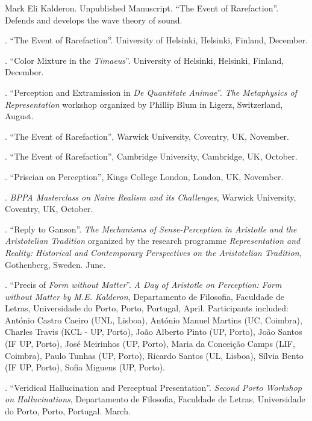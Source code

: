 \documentclass[11pt]{article}
\begin{document}
\ind Mark Eli Kalderon. Unpublished Manuscript. ``The Event of Rarefaction''. Defends and develops the wave theory of sound.

 \bigskip

\medskip
{}. ``The Event of Rarefaction''. University of Helsinki, Helsinki, Finland, December.

. ``Color Mixture in the \emph{Timaeus}''. University of Helsinki, Helsinki, Finland, December.

. ``Perception and Extramission in \emph{De Quantitate Animae}''. \emph{The Metaphysics of Representation} workshop organized by Phillip Blum in Ligerz, Switzerland, August.

. ``The Event of Rarefaction'', Warwick University, Coventry, UK, November.

. ``The Event of Rarefaction'', Cambridge University, Cambridge, UK, October.

. ``Priscian on Perception'', Kings College London, London, UK, November.

. \emph{BPPA Masterclass on Naive Realism and its Challenges}, Warwick University, Coventry, UK, October.

. ``Reply to Ganson''. \emph{The Mechanisms of Sense-Perception in Aristotle and the Aristotelian Tradition} organized by the research programme
\emph{Representation and Reality: Historical and Contemporary Perspectives on the Aristotelian Tradition}, Gothenberg, Sweden. June.

. ``Precis of \emph{Form without Matter}''. \emph{A Day of Aristotle on Perception: Form without Matter by M.E. Kalderon}, Departamento de Filosofia, Faculdade de Letras, Universidade do Porto, Porto, Portugal, April. Participants included: António Castro Caeiro (UNL, Lisboa), António Manuel Martins (UC, Coimbra), Charles Travis (KCL - UP, Porto), João Alberto Pinto (UP, Porto), João Santos (IF UP, Porto), José Meirinhos (UP, Porto), Maria da Conceição Camps (LIF, Coimbra), Paulo Tunhas (UP, Porto), Ricardo Santos (UL, Lisboa), Sílvia Bento (IF UP, Porto), Sofia Miguens (UP, Porto).

. ``Veridical Hallucination and Perceptual Presentation''. \emph{Second Porto Workshop on Hallucinations}, Departamento de Filosofia, Faculdade de Letras, Universidade do Porto, Porto, Portugal. March.
\end{document}
